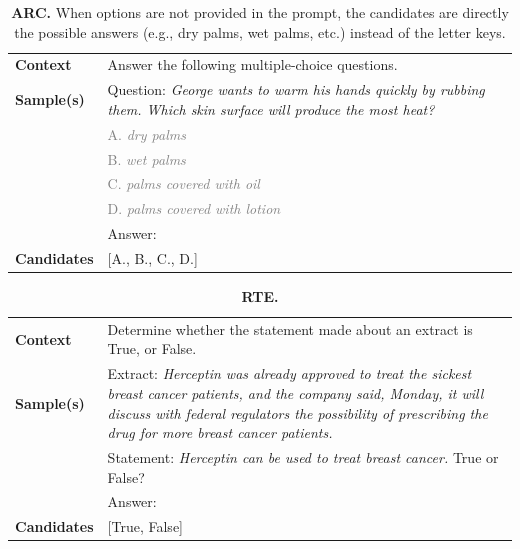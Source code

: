 \documentclass{article}
\begin{document}
\begin{table}[h]
\caption{\textbf{ARC.} When options are not provided in the prompt, the candidates are directly the possible answers (e.g., dry palms, wet palms, etc.) instead of the letter keys.}
\begin{tabular}{lp{11.5cm}}
\toprule
\textbf{Context}   & Answer the following multiple-choice questions.\\
\textbf{Sample(s)} & Question: \emph{George wants to warm his hands quickly by rubbing them. Which skin surface will produce the most heat?} \\
& \textcolor{gray}{A. \emph{dry palms}} \\
& \textcolor{gray}{B. \emph{wet palms}} \\
& \textcolor{gray}{C. \emph{palms covered with oil}} \\
& \textcolor{gray}{D. \emph{palms covered with lotion}} \\
& Answer:\\
\textbf{Candidates}   & {[}A., B., C., D.{]}         \\                                                 \bottomrule                                                                                                         
\end{tabular}
\end{table}


\begin{table}[h]
\caption{\textbf{RTE.}}
\begin{tabular}{lp{11.5cm}}
\toprule
\textbf{Context}   & Determine whether the statement made about an extract is True, or False.\\
\textbf{Sample(s)} & Extract: \emph{Herceptin was already approved to treat the sickest breast cancer patients, and the company said, Monday, it will discuss with federal regulators the possibility of prescribing the drug for more breast cancer patients.} \\
& Statement: \emph{Herceptin can be used to treat breast cancer.} True or False? \\
& Answer:\\
\textbf{Candidates}   & {[}True, False{]}         \\ \bottomrule                                                                                            
\end{tabular}
\end{table}
\end{document}
